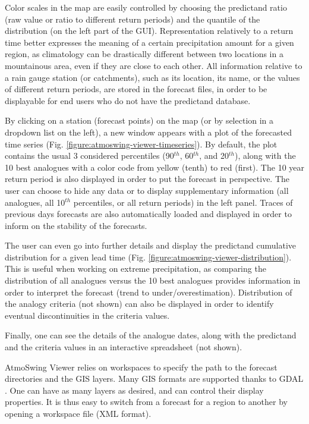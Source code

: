 \documentclass[review]{elsarticle}
\begin{document}
Color scales in the map are easily controlled by choosing the predictand ratio (raw value or ratio to different return periods) and the quantile of the distribution (on the left part of the GUI). Representation relatively to a return time better expresses the meaning of a certain precipitation amount for a given region, as climatology can be drastically different between two locations in a mountainous area, even if they are close to each other. All information relative to a rain gauge station (or catchments), such as its location, its name, or the values of different return periods, are stored in the forecast files, in order to be displayable for end users who do not have the predictand database.

By clicking on a station (forecast points) on the map (or by selection in a dropdown list on the left), a new window appears with a plot of the forecasted time series (Fig. \ref{figure:atmoswing-viewer-timeseries}). By default, the plot contains the usual 3 considered percentiles (90$^{th}$, 60$^{th}$, and 20$^{th}$), along with the 10 best analogues with a color code from yellow (tenth) to red (first). The 10 year return period is also displayed in order to put the forecast in perspective. The user can choose to hide any data or to display supplementary information (all analogues, all 10$^{th}$ percentiles, or all return periods) in the left panel. Traces of previous days forecasts are also automatically loaded and displayed in order to inform on the stability of the forecasts. 

The user can even go into further details and display the predictand cumulative distribution for a given lead time (Fig. \ref{figure:atmoswing-viewer-distribution}). This is useful when working on extreme precipitation, as comparing the distribution of all analogues versus the 10 best analogues provides information in order to interpret the forecast (trend to under/overestimation). Distribution of the analogy criteria (not shown) can also be displayed in order to identify eventual discontinuities in the criteria values.

Finally, one can see the details of the analogue dates, along with the predictand and the criteria values in an interactive spreadsheet (not shown).

AtmoSwing Viewer relies on workspaces to specify the path to the forecast directories and the GIS layers. Many GIS formats are supported thanks to GDAL \cite[Geospatial Data Abstraction Library,][]{GDAL2014}. One can have as many layers as desired, and can control their display properties. It is thus easy to switch from a forecast for a region to another by opening a workspace file (XML format).
\end{document}
